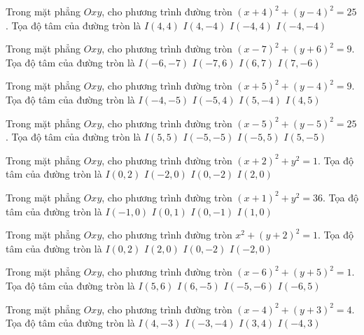 \begin{ex}
Trong mặt phẳng $Oxy$, cho phương trình đường tròn $(x + 4)^2  + (y -4)^2 = 25$. Tọa độ tâm của đường tròn là
\choice
{ $I(4, 4)$ }
{ $I(4, -4)$ }
{ \True $I(-4, 4)$ }
{ $I(-4, -4)$ }
\end{ex}

\begin{ex}
Trong mặt phẳng $Oxy$, cho phương trình đường tròn $(x -7)^2   + (y + 6)^2 = 9$. Tọa độ tâm của đường tròn là
\choice
{ $I(-6, -7)$ }
{ $I(-7, 6)$ }
{ $I(6, 7)$ }
{ \True $I(7, -6)$ }
\end{ex}

\begin{ex}
Trong mặt phẳng $Oxy$, cho phương trình đường tròn $(x + 5)^2  + (y -4)^2 = 9$. Tọa độ tâm của đường tròn là
\choice
{ $I(-4, -5)$ }
{ \True $I(-5, 4)$ }
{ $I(5, -4)$ }
{ $I(4, 5)$ }
\end{ex}

\begin{ex}
Trong mặt phẳng $Oxy$, cho phương trình đường tròn $(x -5)^2   + (y -5)^2 = 25$. Tọa độ tâm của đường tròn là
\choice
{ \True $I(5, 5)$ }
{ $I(-5, -5)$ }
{ $I(-5, 5)$ }
{ $I(5, -5)$ }
\end{ex}

\begin{ex}
Trong mặt phẳng $Oxy$, cho phương trình đường tròn $(x + 2)^2  + y^2 = 1$. Tọa độ tâm của đường tròn là
\choice
{ $I(0, 2)$ }
{ \True $I(-2, 0)$ }
{ $I(0, -2)$ }
{ $I(2, 0)$ }
\end{ex}

\begin{ex}
Trong mặt phẳng $Oxy$, cho phương trình đường tròn $(x + 1)^2  + y^2 = 36$. Tọa độ tâm của đường tròn là
\choice
{ \True $I(-1, 0)$ }
{ $I(0, 1)$ }
{ $I(0, -1)$ }
{ $I(1, 0)$ }
\end{ex}

\begin{ex}
Trong mặt phẳng $Oxy$, cho phương trình đường tròn $x^2 + (y + 2)^2 = 1$. Tọa độ tâm của đường tròn là
\choice
{ $I(0, 2)$ }
{ $I(2, 0)$ }
{ \True $I(0, -2)$ }
{ $I(-2, 0)$ }
\end{ex}

\begin{ex}
Trong mặt phẳng $Oxy$, cho phương trình đường tròn $(x -6)^2   + (y + 5)^2 = 1$. Tọa độ tâm của đường tròn là
\choice
{ $I(5, 6)$ }
{ \True $I(6, -5)$ }
{ $I(-5, -6)$ }
{ $I(-6, 5)$ }
\end{ex}

\begin{ex}
Trong mặt phẳng $Oxy$, cho phương trình đường tròn $(x -4)^2   + (y + 3)^2 = 4$. Tọa độ tâm của đường tròn là
\choice
{ \True $I(4, -3)$ }
{ $I(-3, -4)$ }
{ $I(3, 4)$ }
{ $I(-4, 3)$ }
\end{ex}


